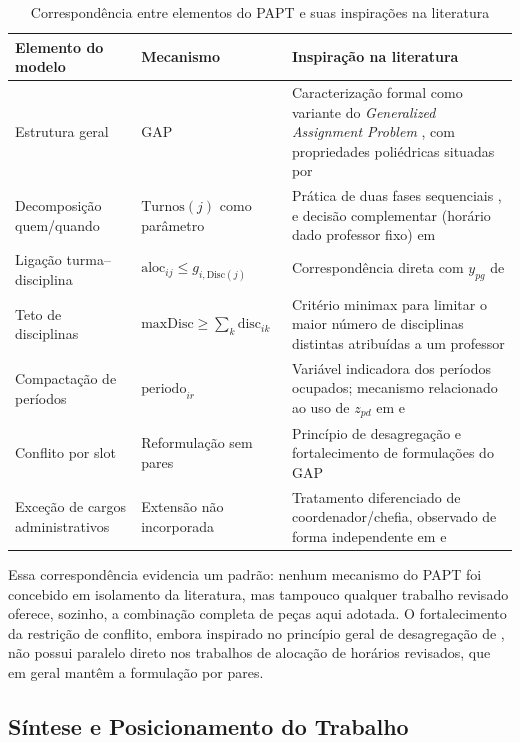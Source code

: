 \documentclass[11pt,a4paper]{article}
\begin{document}
\begin{table}[htbp]
\centering
\caption{Correspondência entre elementos do PAPT e suas inspirações na literatura}
\label{tab:correspondencia_literatura}
\begin{tabular}{p{3.6cm}p{2.6cm}p{6.5cm}}
\toprule
\textbf{Elemento do modelo} & \textbf{Mecanismo} & \textbf{Inspiração na literatura} \\
\midrule
Estrutura geral & GAP & Caracterização formal como variante do \textit{Generalized Assignment Problem} \cite{arenales2007pesquisa}, com propriedades poliédricas situadas por \cite{dantzig1963,martellototh1990} \\
Decomposição quem/quando & $\text{Turnos}(j)$ como parâmetro & Prática de duas fases sequenciais \cite{permanhane2014}, e decisão complementar (horário dado professor fixo) em \cite{modesto2025} \\
Ligação turma--disciplina & $\mathrm{aloc}_{ij}\leq g_{i,\text{Disc}(j)}$ & Correspondência direta com $y_{pg}$ de \cite{permanhane2014} \\
Teto de disciplinas & $\mathrm{maxDisc}\geq\sum_k \mathrm{disc}_{ik}$ & Critério minimax para limitar o maior número de disciplinas distintas atribuídas a um professor \\
Compactação de períodos & $\mathrm{periodo}_{ir}$ & Variável indicadora dos períodos ocupados; mecanismo relacionado ao uso de $z_{pd}$ em \cite{nogueira2018} e \cite{permanhane2014} \\
Conflito por slot & Reformulação sem pares & Princípio de desagregação e fortalecimento de formulações do GAP \cite{murthy2019} \\
Exceção de cargos administrativos & Extensão não incorporada & Tratamento diferenciado de coordenador/chefia, observado de forma independente em \cite{souzafilho2009} e \cite{permanhane2014} \\
\bottomrule
\end{tabular}
\end{table}

Essa correspondência evidencia um padrão: nenhum mecanismo do PAPT foi concebido em isolamento da literatura, mas tampouco qualquer trabalho revisado oferece, sozinho, a combinação completa de peças aqui adotada. O fortalecimento da restrição de conflito, embora
inspirado no princípio geral de desagregação de \cite{murthy2019}, não possui paralelo
direto nos trabalhos de alocação de horários revisados, que em geral mantêm a
formulação por pares.


\subsection{Síntese e Posicionamento do Trabalho}
 
\end{document}
